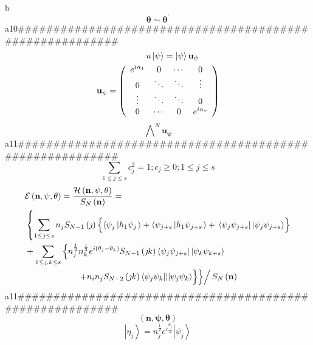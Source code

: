 \documentclass[aps,preprint]{revtex4}%
\begin{document}
b%
\[
\mathbf{\theta\sim\theta}^{\prime}%
\]
a10\#\#\#\#\#\#\#\#\#\#\#\#\#\#\#\#\#\#\#\#\#\#\#\#\#\#\#\#\#\#\#\#\#\#\#\#\#\#\#\#\#\#\#\#\#\#\#\#\#\#\#\#\#\#\#\#\#%
\begin{align*}
&  \left.  \qquad\qquad\right.  u\left\vert \mathbf{\psi}\right\rangle
=\left\vert \mathbf{\psi}\right\rangle \mathbf{u}_{\mathbf{\psi}}\\
\mathbf{u}_{\mathbf{\psi}}  &  =\left(
\begin{array}
[c]{cccc}%
e^{i\alpha_{1}} & 0 & \cdots & 0\\
0 & \ddots & \ddots & \vdots\\
\vdots & \ddots & \ddots & 0\\
0 & \cdots & 0 & e^{i\alpha_{r}}%
\end{array}
\right)
\end{align*}%
\[
\bigwedge\nolimits^{N}\mathbf{u}_{\mathbf{\psi}}%
\]
a11\#\#\#\#\#\#\#\#\#\#\#\#\#\#\#\#\#\#\#\#\#\#\#\#\#\#\#\#\#\#\#\#\#\#\#\#\#\#\#\#\#\#\#\#\#\#\#\#\#\#\#\#\#\#\#\#\#%
\[
\sum\limits_{1\leq j\leq s}c_{j}^{2}=1;c_{j}\geq0;1\leq j\leq s
\]%
\begin{align*}
&  \mathcal{E}\left(  \mathbf{n},\mathbf{\psi},\mathbf{\theta}\right)
=\frac{\mathcal{H}\left(  \mathbf{n},\mathbf{\psi},\mathbf{\theta}\right)
}{S_{N}\left(  \mathbf{n}\right)  }=\\
&  \left\{  \sum_{1\leq j\leq s}n_{j}S_{N-1}\left(  \jmath\right)  \left\{
\overset{}{\left\langle \psi_{j}\left\vert h_{1}\psi_{j}\right.  \right\rangle
+\left\langle \psi_{j+s}\left\vert h_{1}\psi_{j+s}\right.  \right\rangle
}+\,\left\langle \psi_{j}\psi_{j+s}\right\vert \left\vert \psi_{j}\psi
_{j+s}\right\rangle \right\}  \right. \\
&  +\sum_{1\leq j,k\leq s}\left\{  n_{j}^{\frac{1}{2}}n_{k}^{\frac{1}{2}%
}e^{i\left(  \theta_{j}-\theta_{k}\right)  }S_{N-1}\left(  \jmath k\right)
\left\langle \psi_{j}\psi_{j+s}\right\vert \left\vert \psi_{k}\psi
_{k+s}\right\rangle \right. \\
&  \qquad\qquad\qquad\left.  \left.  \left.  +\overset{}{n_{i}n_{j}%
S_{N-2}\left(  \jmath k\right)  \left\langle \psi_{j}\psi_{k}|||\psi_{j}%
\psi_{k}\right\rangle }\right\}  \right\}  \right/  S_{N}\left(
\mathbf{n}\right)
\end{align*}
a11\#\#\#\#\#\#\#\#\#\#\#\#\#\#\#\#\#\#\#\#\#\#\#\#\#\#\#\#\#\#\#\#\#\#\#\#\#\#\#\#\#\#\#\#\#\#\#\#\#\#\#\#\#\#\#\#\#%
\[
\left(  \mathbf{n},\mathbf{\psi},\mathbf{\theta}\right)
\]%
\[
\left\vert \eta_{j}\right\rangle =n_{j}^{\frac{1}{2}}e^{i\frac{\theta_{j}}{2}%
}\left\vert \psi_{j}\right\rangle
\]%
\end{document}
